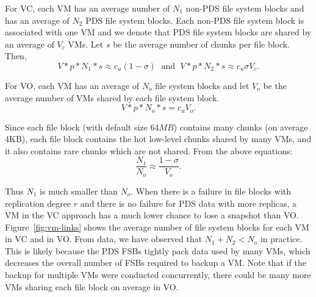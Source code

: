 For VC, each VM has an average number of $N_1$ non-PDS file system blocks
and  has  an average of  $N_2$ PDS file system blocks. 
Each non-PDS file system block is associated with one VM
 and  we denote that PDS file system blocks are
shared by an average of $V_c$ VMs. Let $s$ be the average number of chunks per file block. Then, 
\[
V *p*N_1 *s  \approx c_u (1-\sigma)\; \mbox{ and } \; 
V *p*N_2 *s  \approx c_u \sigma V_c.
\]

For VO, each VM has an average of $N_o$ file system blocks
and let $V_o$ be the average number of VMs shared by each file system block.
\[
V *p*N_o *s  = c_u  V_o.
\]

Since each file block (with default size $64MB$) contains many chunks (on average 4KB),
each file block contains the hot low-level chunks shared by many VMs, and it also contains
rare chunks which are not shared.  From the above equations:
\[
\frac{N_1}{N_o} \approx  \frac{1-\sigma}{V_o}.
\] 

Thus $N_1$ is much smaller than $N_o$. 
When there is a failure in file blocks with replication degree $r$
and there is no failure for PDS data with more replicas,   a VM in
the VC approach has a much lower chance to lose a snapshot than VO. 
Figure~\ref{fig:vm-links} shows the average number of file system blocks for each VM in VC and in VO. 
From data, we have observed that $N_1 +N_2 < N_o$ in practice. 
This is likely because the PDS FSBs tightly pack data used by many VMs, 
which decreases the overall number of FSBs required to backup a VM.
Note that  if  the backup for multiple VMs were conducted concurrently, there could be many more
VMs sharing each file block on average in VO. 



